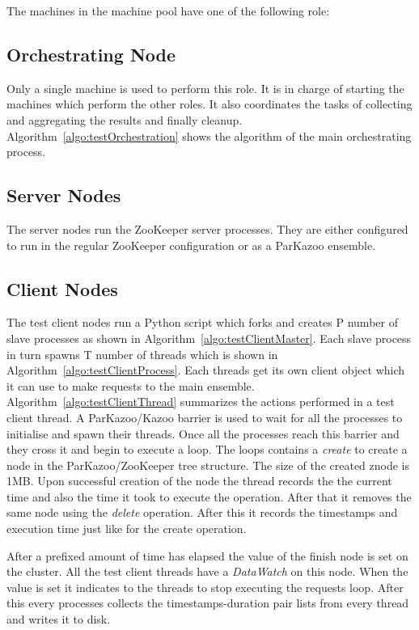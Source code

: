 The machines in the machine pool have one of the following role:
\subsection{Orchestrating Node}
Only a single machine is used to perform this role. It is in charge of starting the machines which perform the other roles. It also coordinates the tasks of collecting and aggregating the results and finally cleanup. Algorithm~\ref{algo:testOrchestration} shows the algorithm of the main orchestrating process.
\subsection{Server Nodes}
The server nodes run the ZooKeeper server processes. They are either configured to run in the regular ZooKeeper configuration or as a ParKazoo ensemble.
\subsection{Client Nodes}
The test client nodes run a Python script which forks and creates P number of slave processes as shown in Algorithm~\ref{algo:testClientMaster}. Each slave process in turn spawns T number of threads which is shown in Algorithm~\ref{algo:testClientProcess}. Each threads get its own client object which it can use to make requests to the main ensemble. Algorithm~\ref{algo:testClientThread} summarizes the actions performed in a test client thread. A ParKazoo/Kazoo barrier is used to wait for all the processes to initialise and spawn their threads. Once all the processes reach this barrier and they cross it and begin to execute a loop. The loops contains a \textit{create} to create a node in the ParKazoo/ZooKeeper tree structure. The size of the created znode is 1MB. Upon successful creation of the node the thread records the the current time and also the time it took to execute the operation. After that it removes the same node using the \textit{delete} operation. After this it records the timestamps and execution time just like for the create operation.

After a prefixed amount of time has elapsed the value of the finish node is set on the cluster. All the test client threads have a \textit{DataWatch} on this node. When the value is set it indicates to the threads to stop executing the requests loop. After this every processes collects the timestamps-duration pair lists from every thread and writes it to disk. 


